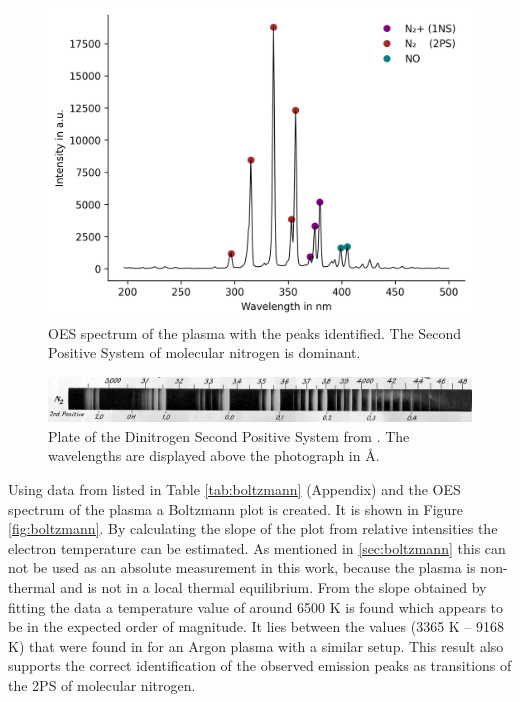 \begin{figure}
    \centering
    \includegraphics[width=1\textwidth]{images/OES_analysis.png}
    \caption[OES spectrum with identification]{OES spectrum of the plasma with the peaks identified. The Second Positive System of molecular nitrogen is dominant.}
    \label{fig:oes_analysis}
\end{figure}

\begin{figure}
    \centering
    \includegraphics[width=1\textwidth]{images/N2_2PS.jpeg}
    \caption[Dinitrogen Second Positive System from literature]{Plate of the Dinitrogen Second Positive System from \cite{book}. The wavelengths are displayed above the photograph in Å.}
    \label{fig:n2_2ps}
\end{figure}


Using data from \cite{coefficients} listed in Table \ref{tab:boltzmann} (Appendix) and the OES spectrum of the plasma a Boltzmann plot is created. It is shown in Figure \ref{fig:boltzmann}. By calculating the slope of the plot from relative intensities the electron temperature can be estimated. As mentioned in \ref{sec:boltzmann} this can not be used as an absolute measurement in this work, because the plasma is non-thermal and is not in a local thermal equilibrium. From the slope obtained by fitting the data a temperature value of around 6500 K is found which appears to be in the expected order of magnitude. It lies between the values (3365 K -- 9168 K) that were found in \cite{oes_temperature} for an Argon plasma with a similar setup. This result also supports the correct identification of the observed emission peaks as transitions of the 2PS of molecular nitrogen.

